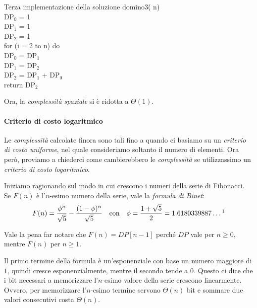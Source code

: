 \begin{minicode}{Terza implementazione della soluzione}
    \ind{} domino3( n)\\
         DP$_0$ = 1\\
         DP$_1$ = 1\\
         DP$_2$ = 1\\
        \indf for (i = 2 to n) do\\
            DP$_0$ = DP$_1$\\
            DP$_1$ = DP$_2$\\
            DP$_2$ = DP$_1$ + DP$_0$\\
        \indf return DP$_2$
\end{minicode}\noindent
Ora, la \emph{complessità spaziale} si è ridotta a $\Theta(1)$.

\paragraph{Criterio di costo logaritmico}
Le \emph{complessità} calcolate finora sono tali fino a quando ci basiamo su
un \emph{criterio di costo uniforme}, nel quale consideriamo soltanto il
numero di elementi. Ora però, proviamo a chiederci come cambierebbero le
\emph{complessità} se utilizzassimo un \emph{criterio di costo logaritmico}.

\noindent
Iniziamo ragionando sul modo in cui crescono i numeri della serie di Fibonacci.
Se $F(n)$ è l'$n$-esimo numero della serie, vale la \emph{formula di Binet}:
\[F(n)=\frac{\phi^n}{\sqrt{5}}-\frac{(1-\phi)^n}{\sqrt{5}}\quad\text{con}
\quad\phi=\frac{1+\sqrt{5}}{2}=1.6180339887\dots\footnotemark\]
\begin{note}
    Vale la pena far notare che $F(n)=DP[n-1]$ perché $DP$ vale per $n\geq0$,
    mentre $F(n)$ per $n\geq1$.
\end{note}\noindent
Il primo termine della formula è un'esponenziale con base un numero maggiore di $1$,
quindi cresce esponenzialmente, mentre il secondo tende a $0$. Questo ci dice
che i bit necessari a memorizzare l'$n$-esimo valore della serie crescono
linearmente. Ovvero, per memorizzare l'$n$-esimo termine servono $\Theta(n)$ bit
e sommare due valori consecutivi costa $\Theta(n)$.



